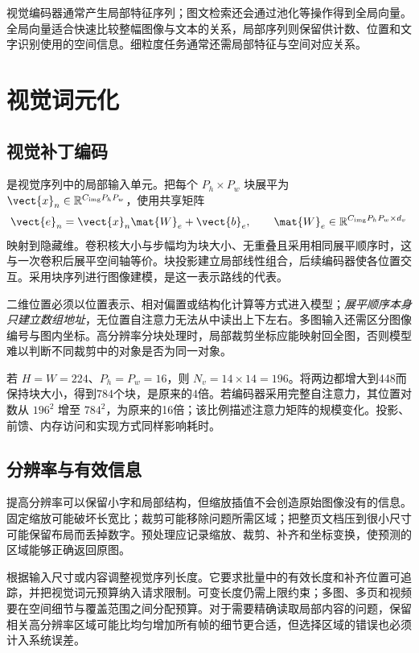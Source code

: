 \documentclass[../textbook.tex]{subfiles}
\begin{document}
视觉编码器通常产生局部特征序列；图文检索还会通过池化等操作得到全局向量。全局向量适合快速比较整幅图像与文本的关系，局部序列则保留供计数、位置和文字识别使用的空间信息。细粒度任务通常还需局部特征与空间对应关系。

\section{视觉词元化}

\subsection{视觉补丁编码}
是视觉序列中的局部输入单元。把每个 $P_h\times P_w$ 块展平为 $\vect{x}_n\in\mathbb R^{C_{\mathrm{img}}P_hP_w}$，使用共享矩阵
\begin{equation}
 \vect{e}_n=\vect{x}_n\mat{W}_e+\vect{b}_e,\qquad
 \mat{W}_e\in\mathbb R^{C_{\mathrm{img}}P_hP_w\times d_v}
\end{equation}
映射到隐藏维。卷积核大小与步幅均为块大小、无重叠且采用相同展平顺序时，这与一次卷积后展平空间轴等价。块投影建立局部线性组合，后续编码器使各位置交互。采用块序列进行图像建模，是这一表示路线的代表\cite{dosovitskiyImageWorth16x162022}。

二维位置必须以位置表示、相对偏置或结构化计算等方式进入模型；\emph{展平顺序本身只建立数组地址}，无位置自注意力无法从中读出上下左右。多图输入还需区分图像编号与图内坐标。高分辨率分块处理时，局部裁剪坐标应能映射回全图，否则模型难以判断不同裁剪中的对象是否为同一对象。

若 $H=W=224$、$P_h=P_w=16$，则 $N_v=14\times14=196$。将两边都增大到448而保持块大小，得到784个块，是原来的4倍。若编码器采用完整自注意力，其位置对数从 $196^2$ 增至 $784^2$，为原来的16倍；该比例描述注意力矩阵的规模变化。投影、前馈、内存访问和实现方式同样影响耗时。

\subsection{分辨率与有效信息}
提高分辨率可以保留小字和局部结构，但缩放插值不会创造原始图像没有的信息。固定缩放可能破坏长宽比；裁剪可能移除问题所需区域；把整页文档压到很小尺寸可能保留布局而丢掉数字。预处理应记录缩放、裁剪、补齐和坐标变换，使预测的区域能够正确返回原图。

根据输入尺寸或内容调整视觉序列长度。它要求批量中的有效长度和补齐位置可追踪，并把视觉词元预算纳入请求限制。可变长度仍需上限约束；多图、多页和视频要在空间细节与覆盖范围之间分配预算。对于需要精确读取局部内容的问题，保留相关高分辨率区域可能比均匀增加所有帧的细节更合适，但选择区域的错误也必须计入系统误差。
\end{document}

